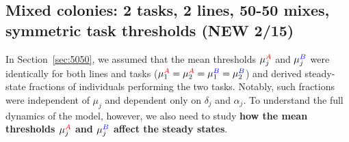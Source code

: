 \documentclass[10pt]{article}
\theoremstyle{remark}
\newcommand{\A}{{\color{red}A}}
\newcommand{\B}{{\color{blue}B}}
\begin{document}
\subsection{Mixed colonies: 2 tasks, 2 lines, 50-50 mixes, symmetric task thresholds (NEW 2/15)}

In Section~\ref{sec:5050}, we assumed that the mean thresholds $\mu_{j}^{\A}$ and $\mu_{j}^{\B}$ were identically for both lines and tasks ($\mu_{1}^{\A} = \mu_{2}^{\A} = \mu_{1}^{\B} = \mu_{2}^{\B}$)
and derived steady-state fractions of individuals performing the two tasks. Notably, such fractions were independent of $\mu_{j}$ and dependent only on $\delta_j$ and $\alpha_{j}$.  To understand the full dynamics of the model, however, we also need to study \textbf{how the mean thresholds $\mu_{j}^{\A}$ and $\mu_{j}^{\B}$ affect the steady states}.
\end{document}
